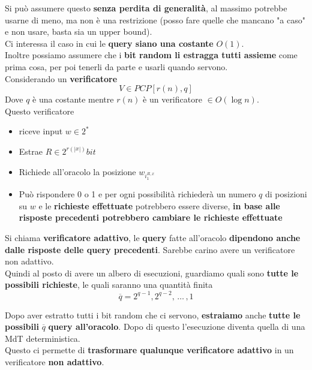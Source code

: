 Si può assumere questo \textbf{senza perdita di generalità}, al massimo potrebbe usarne di meno, ma non è una restrizione (posso fare quelle che mancano "a caso" e non usare, basta sia un upper bound).\\

Ci interessa il caso in cui le \textbf{query siano una costante} $O(1)$.\\

Inoltre possiamo assumere che i \textbf{bit random li estragga tutti assieme} come prima cosa, per poi tenerli da parte e usarli quando servono.\\

Considerando un \textbf{verificatore} 
$$ V \in PCP [r (n), q] $$
Dove $q$ è una costante mentre $r(n)$ è un verificatore $\in O(\log n)$. \\
Questo verificatore 
\begin{itemize}
	\item riceve input $w \in 2^\ast$
	\item Estrae $R \in 2^{r(|x|)} bit$
	\item Richiede all'oracolo la posizione $w_{i_1^{R,x}}$
	\item Può rispondere 0 o 1 e per ogni possibilità richiederà un numero $q$ di posizioni su $w$ e le \textbf{richieste effettuate} potrebbero essere diverse, \textbf{in base alle risposte precedenti potrebbero cambiare le richieste effettuate}
\end{itemize}

Si chiama \textbf{verificatore adattivo}, le \textbf{query} fatte all'oracolo \textbf{dipendono anche dalle risposte delle query precedenti}.  Sarebbe carino avere un verificatore non adattivo.\\

Quindi al posto di avere un albero di esecuzioni, guardiamo quali sono \textbf{tutte le possibili richieste}, le quali saranno una quantità finita
$$ \overline q = 2^{q-1}, 2^{q-2}, \, \dots \, , 1$$

Dopo aver estratto tutti i bit random che ci servono, \textbf{estraiamo} anche \textbf{tutte le possibili} $\overline q$ \textbf{query all'oracolo}. Dopo di questo l'esecuzione diventa quella di una MdT deterministica.\\

Questo ci permette di \textbf{trasformare qualunque verificatore adattivo} in un verificatore \textbf{non adattivo}.\\


